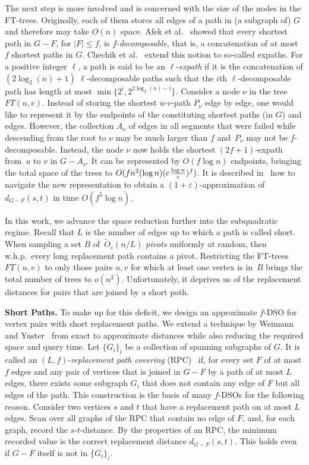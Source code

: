 \documentclass{article}\usepackage[a4paper,margin=20mm]{geometry}
\newcommand*{\Otilde}{\widetilde{O}}
\newcommand*{\nwspace}{\hspace*{.1em}}
\renewcommand{\le}{\leqslant}
\newcommand{\eps}{\varepsilon}
\begin{document}
The next step is more involved and is concerned with the size of the nodes in the FT-trees.
Originally, each of them stores all edges of a path in (a subgraph of) $G$ 
and therefore may take $O(n)$ space.
Afek et al.~\cite{Afek02RestorationbyPathConcatenation_journal}
showed that every shortest path in $G{-}F$, for $|F| \le f$, is  $f$-\emph{decomposable},
that is, a concatenation of at most $f$ shortest paths in $G$.
Chechik et al.~\cite{ChCoFiKa17} extend this notion to so-called expaths.
For a positive integer $\ell$, a path is said to be an \mbox{$\ell$-\emph{expath}}
if it is the concatenation of $(2\log_2(n)+1)$ \mbox{$\ell$-decomposable} paths
such that the $i$th $\ell$-decomposable path has length at most $\min\{ 2^i,2^{2\log_2(n) -i}\}$.
Consider a node $\nu$ in the tree $FT(u,v)$.
Instead of storing the shortest $u$-$v$-path $P_\nu$ edge by edge,
one would like to represent it
by the endpoints of the constituting shortest paths (in $G$) and edges.
However, the collection $A_\nu$ of edges in all segments
that were failed while descending from the root to $\nu$ may be much larger than $f$
and~$P_{\nu}$ may not be $f$-decomposable.
Instead, the node $\nu$ now holds the shortest $(2f{+}1)$-expath from~$u$ to $v$ in $G-A_\nu$.
It can be represented by $O(f \log n)$ endpoints,
bringing the total space of the trees to $O(fn^2 (\log n)(c \nwspace \frac{\log n}{\eps})^f)$.
It is described in~\cite{ChCoFiKa17} how to navigate the new representation
to obtain a $(1{+}\eps)$-approximation of $d_{G-F}(s,t)$ in time $O(f^5 \log n)$.

In this work, we advance the space reduction further into the subquadratic regime.
Recall that $L$ is the number of edges up to which a path is called short.
When sampling a set $B$ of~$\Otilde_\eps(n/L)$ \emph{pivots} uniformly at random,
then w.h.p.\ every long replacement path contains a pivot. 
Restricting the FT-trees $FT(u,v)$ to only those pairs $u,v$ 
for which at least one vertex is in~$B$ brings the total number of trees to $o(n^2)$.
Unfortunately, it deprives us of the replacement distances for pairs
that are joined by a short path.
\vspace*{.5em}

\noindent
\textbf{Short Paths.}
To make up for this deficit, we design an approximate $f$-DSO for
vertex pairs with short replacement paths.
We extend a technique by Weimann and Yuster~\cite{WY13}
from exact to approximate distances while also reducing the required space and query time.
Let $\{G_i\}_i$ be a collection of spanning subgraphs of $G$.
It is called an 
$(L,f)$-\emph{replacement path covering} (RPC)~\cite{KarthikParter21DeterministicRPC}
if, for every set $F$ of at most $f$ edges and any pair of vertices that is joined in $G{-}F$
by a path of at most $L$ edges, there exists some subgraph $G_i$ that does not contain any edge of $F$
but all edges of the path.
This construction is the basis of many $f$-DSOs for the following reason.
Consider two vertices $s$ and $t$ that have a replacement path on at most $L$ edges.
Scan over all graphs of the RPC that contain no edge of $F$,
and, for each graph, record the $s$-$t$-distance.
By the properties of an RPC, the minimum recorded value is the correct replacement distance $d_{G-F}(s,t)$.
This holds even if $G{-}F$ itself is not in $\{G_i\}_i$.
\end{document}
